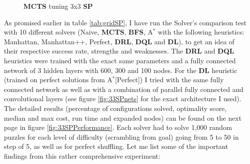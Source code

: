\begin{figure}[H]
  \noindent
\caption[33SPPerformanceMCTS]{\textbf{MCTS} tuning 3x3 \textbf{SP}}
\label{fig:33SPPerformanceMCTS}
\end{figure}



\label{ssec:33SPSC}
\label{sec:S33DRLDQL}
As promised earlier in table \ref{tab:gridSP}, I have run the Solver's comparison test with 10 different solvers (Naive, \textbf{MCTS}, \textbf{BFS}, A$^{*}$ with the following heuristics: Manhattan, Manhattan++, Perfect, \textbf{DRL}, \textbf{DQL} and \textbf{DL}), to get an idea of their respective success rate, strengths and weaknesses. The \textbf{DRL} and \textbf{DQL} heuristics were trained with the exact same parameters and a fully connected network of 3 hidden layers with 600, 300 and 100 nodes. For the \textbf{DL} heuristic (trained on perfect solutions from A$^{*}$[Perfect]) I tried with the same fully connected network as well as with a combination of parallel fully connected and convolutional layers (see figure \ref{fig:33SPnets} for the exact architecture I used). The detailed results (percentage of configurations solved, optimality score, median and max cost, run time and expanded nodes) can be found on the next page  in figure \ref{fig:33SPPerformance}. Each solver had to solve 1,000 random puzzles for each level of difficulty (scrambling from goal) going from 5 to 50 in step of 5, as well as for perfect shuffling. Let me list some of the important findings from this rather comprehensive experiment:

